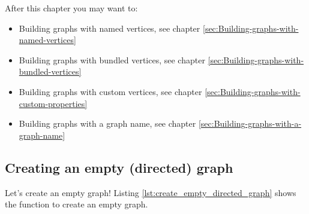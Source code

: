 After this chapter you may want to:

\begin{itemize}
  \item Building graphs with named vertices, 
    see chapter \ref{sec:Building-graphs-with-named-vertices}
  \item Building graphs with bundled vertices, 
    see chapter \ref{sec:Building-graphs-with-bundled-vertices}
  \item Building graphs with custom vertices,
    see chapter \ref{sec:Building-graphs-with-custom-properties}
  \item Building graphs with a graph name,
    see chapter \ref{sec:Building-graphs-with-a-graph-name}
\end{itemize}

\subsection{Creating an empty (directed) graph}
\label{subsec:create_empty_directed_graph}

Let's create an empty graph! 
Listing \ref{lst:create_empty_directed_graph} shows the function to create an empty graph.



